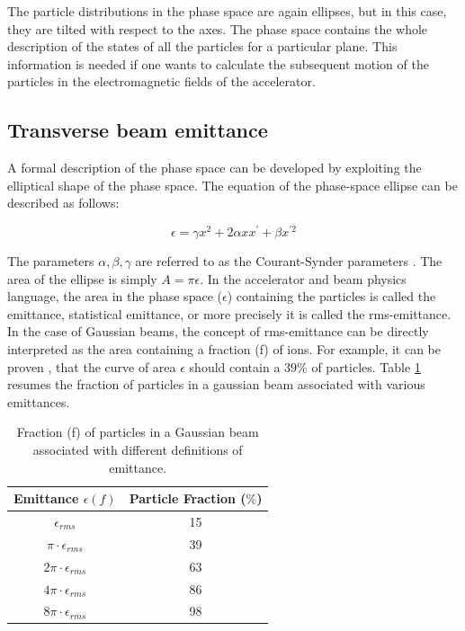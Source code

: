 The particle distributions in the phase space are again ellipses, but in this case, they are tilted with respect to the axes. The phase space contains the whole description of the states of all the particles for a particular plane. This information is needed if one wants to calculate the subsequent motion of the particles in the electromagnetic fields of the accelerator. 

\subsection{Transverse beam emittance}
\label{subsec:TransBeamEm}

A formal description of the phase space can be developed by exploiting the elliptical shape of the phase space. The equation of the phase-space ellipse can be described as follows: 

\begin{equation}
    \epsilon = \gamma x^2 + 2\alpha x x^{'} + \beta x^{'2}
    \label{eq:ellipse}
\end{equation}

The parameters $\alpha, \beta, \gamma$ are referred to as the Courant-Synder parameters \parencite*[][]{ref:BookAccPhysics}. The area of the ellipse is simply $A = \pi \epsilon$. In the accelerator and beam physics language, the area in the phase space ($\epsilon$) containing the particles is called the emittance, statistical emittance, or more precisely it is called the rms-emittance. In the case of Gaussian beams, the concept of rms-emittance can be directly interpreted as the area containing a fraction (f) of ions. For example, it can be proven \parencite*[][]{ref:BookAccPhysics2},  that the curve of area $\epsilon$ should contain a $39\%$ of particles. Table \ref{tab:ParticleProportion} resumes the fraction of particles in a gaussian beam associated with various emittances. 


\begin{table}[h]
    \centering
    \begin{tabular}{cc}
    \hline
    Emittance $\epsilon(f)$ & Particle Fraction ($\%$) \\ \hline
    $\epsilon_{rms}$       & 15                     \\
    $\pi \cdot \epsilon_{rms}$     & 39                     \\
    $2\pi \cdot \epsilon_{rms}$  & 63                     \\
    $4\pi \cdot \epsilon_{rms}$  & 86                     \\
    $8\pi \cdot \epsilon_{rms}$   & 98                     \\ \hline
    \end{tabular}
    \caption{Fraction (f) of particles in a Gaussian beam associated with different definitions of emittance.}
    \label{tab:ParticleProportion}
\end{table}


